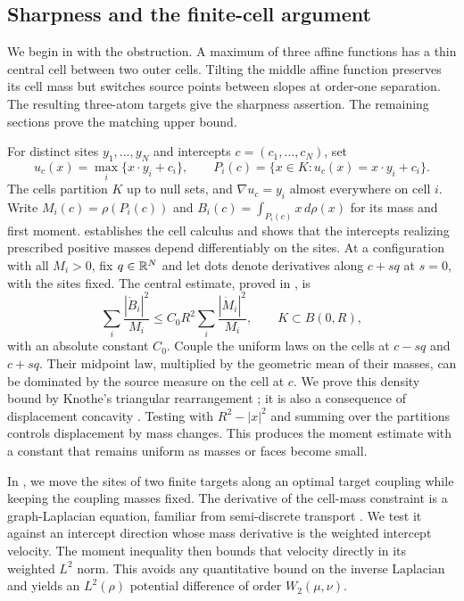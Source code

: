 \subsection{Sharpness and the finite-cell argument}

We begin in  with the obstruction. A maximum of
three affine functions has a thin central cell between two outer cells.
Tilting the middle affine function preserves its cell mass but switches
source points between slopes at order-one separation. The resulting
three-atom targets give the sharpness assertion. The remaining sections
prove the matching upper bound.

For distinct sites \(y_1,\ldots,y_N\) and intercepts
\(c=(c_1,\ldots,c_N)\), set
\[
 u_c(x)=\max_i\{x\cdot y_i+c_i\},\qquad
 P_i(c)=\{x\in K:u_c(x)=x\cdot y_i+c_i\}.
\]
The cells partition \(K\) up to null sets, and \(\nabla u_c=y_i\)
almost everywhere on cell \(i\). Write
\(M_i(c)=\rho(P_i(c))\) and
\(B_i(c)=\int_{P_i(c)}x\,d\rho(x)\) for its mass and first moment.
 establishes the cell calculus and shows that the
intercepts realizing prescribed positive masses depend differentiably
on the sites. At a configuration with all \(M_i>0\), fix
\(q\in\mathbb R^N\) and let dots denote derivatives along \(c+s q\) at
\(s=0\), with the sites fixed.
The central estimate, proved in , is
\[
 \sum_i\frac{|\dot B_i|^2}{M_i}
 \le C_0R^2\sum_i\frac{|\dot M_i|^2}{M_i},
 \qquad K\subset B(0,R),
\]
with an absolute constant \(C_0\). Couple the uniform laws on the cells
at \(c-s q\) and \(c+s q\). Their midpoint law, multiplied by the
geometric mean of their masses, can be dominated by the source measure
on the cell at \(c\). We prove this density bound by Knothe's triangular
rearrangement \cite{Knothe1957}; it is also a consequence of displacement
concavity \cite[Theorem~2.3]{McCann1997}. Testing with
\(R^2-|x|^2\) and summing over the partitions controls displacement by
mass changes. This produces the moment estimate with a constant that
remains uniform as masses or faces become small.

In , we move the sites of two finite targets
along an optimal target coupling while keeping the coupling masses
fixed. The derivative of the cell-mass constraint is a graph-Laplacian
equation, familiar from semi-discrete transport
\cite{KitagawaMerigotThibert2019}. We test it against an intercept
direction whose mass derivative is the weighted intercept velocity.
The moment inequality then bounds that velocity directly in its
weighted \(L^2\) norm. This avoids any quantitative bound on the inverse
Laplacian and yields an \(L^2(\rho)\) potential difference of order
\(W_2(\mu,\nu)\).

